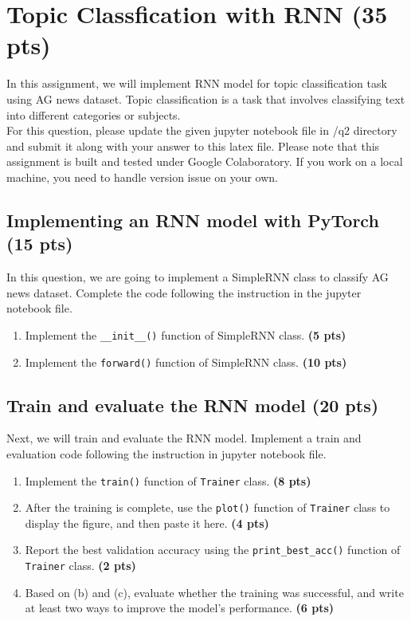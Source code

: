 \documentclass{assignment format}
\begin{document}
\section{Topic Classfication with RNN (35 pts)}

In this assignment, we will implement RNN model for topic classification task using AG news dataset. Topic classification is a task that involves classifying text into different categories or subjects.\\
For this question, please update the given jupyter notebook file in /q2 directory and submit it along with your answer to this latex file. Please note that this assignment is built and tested under Google Colaboratory. If you work on a local machine, you need to handle version issue on your own. 

\subsection{Implementing an RNN model with PyTorch (15 pts)}
In this question, we are going to implement a SimpleRNN class to classify AG news dataset. Complete the code following the instruction in the jupyter notebook file.
\begin{enumerate}[label=(\alph*)]
    \item Implement the \texttt{\_\_init\_\_()} function of SimpleRNN class. \textbf{(5 pts)}
    \item Implement the \texttt{forward()} function of SimpleRNN class. \textbf{(10 pts)}
\end{enumerate}
\subsection{Train and evaluate the RNN model (20 pts)}
Next, we will train and evaluate the RNN model. Implement a train and evaluation code following the instruction in jupyter notebook file.
\begin{enumerate}[label=(\alph*)]
    \item Implement the \texttt{train()} function of \texttt{Trainer} class. \textbf{(8 pts)}
    \item After the training is complete, use the \texttt{plot()} function of \texttt{Trainer} class to display the figure, and then paste it here. \textbf{(4 pts)}
    \item Report the best validation accuracy using the \texttt{print\_best\_acc()} function of \texttt{Trainer} class. \textbf{(2 pts)}
    \item Based on (b) and (c), evaluate whether the training was successful, and write at least two ways to improve the model's performance. \textbf{(6 pts)}
\end{enumerate}
    
\end{document}
